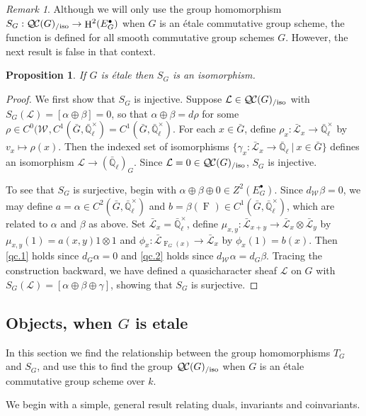 \documentclass{amsart}
\theoremstyle{plain}
\newtheorem{proposition}[theorem]{Proposition}
\theoremstyle{definition}
\theoremstyle{remark}
\newtheorem{remark}[theorem]{Remark}
\newcommand{\EE}{\mathbb{\bar Q}_\ell}
\newcommand{\Fq}{k}
\newcommand{\EEx}{\EE^\times}
\newcommand{\Weil}[1]{\mathcal{W}_{#1}}
\newcommand{\Frob}[1]{\operatorname{F}_{#1}}
\DeclareMathOperator{\Hh}{H}
\newcommand{\tq}{{\ \vert\ }}
\newcommand{\TrFrob}[1]{T_{#1}}
\newcommand{\qcs}[1]{{\mathcal{#1}}}
\newcommand{\gqcs}[1]{{\mathcal{\bar #1}}}
\newcommand{\QC}{{\mathcal{Q\hskip-0.8pt C}}}
\newcommand{\QCiso}[1]{\QC(#1)_{/\text{iso}}}
\begin{document}
\begin{remark}
Although we will only use the group homomorphism $S_G : \QCiso{G}\to \Hh^2(E^\bullet_G)$ when $G$ is an étale commutative group scheme, the function is defined for all smooth commutative group schemes $G$.
However, the next result is false in that context.
\end{remark}

\begin{proposition}
If $G$ is \'etale then $S_G$ is an isomorphism.
\end{proposition}
\begin{proof}
We first show that $S_G$ is injective.  Suppose $\qcs{L} \in \QCiso{G}$ with $S_G(\qcs{L}) = [\alpha \oplus \beta] = 0$,
so that $\alpha \oplus \beta = d\rho$ for some $\rho \in C^0(\Weil{},C^1({\bar G},\EEx) = C^1({\bar G},\EEx)$.
For each $x\in {\bar G}$, define $\rho_x : \gqcs{L}_x \to \EEx$ by $v_x \mapsto \rho(x)$.
Then the indexed set of isomorphisms $\{ \gamma_x : \gqcs{L}_x \to \EE \tq x\in {\bar G}\}$
defines an isomorphism $\qcs{L} \to (\EE)_G$.
Since $\qcs{L} = 0 \in \QCiso{G}$, $S_G$ is injective.

To see that $S_G$ is surjective, begin with $\alpha\oplus\beta\oplus 0 \in Z^2(E^\bullet_G)$.
Since $d_{\Weil{}} \beta = 0$, we may define $a = \alpha \in C^2({\bar G},\EEx)$ and
$b = \beta(\Frob{}) \in C^1({\bar G},\EEx)$, which are related to $\alpha$ and $\beta$ as above.
Set $\gqcs{L}_x = \EEx$, define $\mu_{x,y} : \gqcs{L}_{x+y} \to \gqcs{L}_x\otimes\gqcs{L}_y$
by $\mu_{x,y}(1) = a(x,y) 1\otimes 1$ and $\phi_x : \gqcs{L}_{\Frob{G}(x)} \to \gqcs{L}_x$ by $\phi_x(1)= b(x)$.
Then \ref{qc.1} holds since $d_G \alpha =0$ and \ref{qc.2} holds since $d_{\Weil{}}\alpha =d_G \beta$.
Tracing the construction backward, we have defined a quasicharacter sheaf $\qcs{L}$ on $G$ with
$S_G(\qcs{L}) = [\alpha\oplus\beta\oplus\gamma]$, showing that $S_G$ is surjective.
\end{proof}

\subsection{Objects, when $G$ is etale}\label{ssec:SandT}

In this section we find the relationship between the group homomorphisms $\TrFrob{G}$ and $S_G$, and use this to find the group $\QCiso{G}$ when $G$ is an étale commutative group scheme over $\Fq$.

%
We begin with a simple, general result relating duals, invariants and coinvariants.
\end{document}
